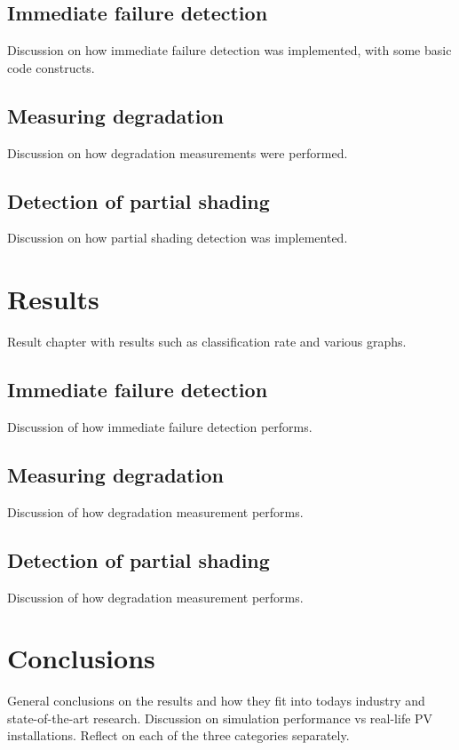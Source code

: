 \section{Immediate failure detection}
Discussion on how immediate failure detection was implemented, with some basic code constructs.

\section{Measuring degradation}
Discussion on how degradation measurements were performed.

\section{Detection of partial shading}
Discussion on how partial shading detection was implemented.

\chapter{Results}
Result chapter with results such as classification rate and various graphs.

\section{Immediate failure detection}
Discussion of how immediate failure detection performs.

\section{Measuring degradation}
Discussion of how degradation measurement performs.

\section{Detection of partial shading}
Discussion of how degradation measurement performs.

\chapter{Conclusions}
General conclusions on the results and how they fit into todays industry and state-of-the-art research.
Discussion on simulation performance vs real-life PV installations.
Reflect on each of the three categories separately.





